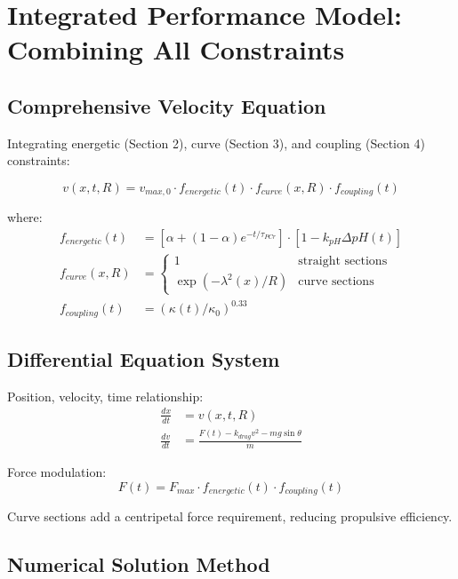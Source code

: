 \section{Integrated Performance Model: Combining All Constraints}

\subsection{Comprehensive Velocity Equation}

Integrating energetic (Section 2), curve (Section 3), and coupling (Section 4) constraints:

\begin{equation}
v(x,t,R) = v_{max,0} \cdot f_{energetic}(t) \cdot f_{curve}(x,R) \cdot f_{coupling}(t)
\end{equation}

where:
\begin{align}
f_{energetic}(t) &= \left[\alpha + (1-\alpha)e^{-t/\tau_{PCr}}\right] \cdot \left[1 - k_{pH}\Delta pH(t)\right] \\
f_{curve}(x,R) &= \begin{cases}
1 & \text{straight sections} \\
\exp(-\lambda^2(x)/R) & \text{curve sections}
\end{cases} \\
f_{coupling}(t) &= (\kappa(t)/\kappa_0)^{0.33}
\end{align}

\subsection{Differential Equation System}

Position, velocity, time relationship:
\begin{align}
\frac{dx}{dt} &= v(x,t,R) \\
\frac{dv}{dt} &= \frac{F(t) - k_{drag}v^2 - mg\sin\theta}{m}
\end{align}

Force modulation:
\begin{equation}
F(t) = F_{max} \cdot f_{energetic}(t) \cdot f_{coupling}(t)
\end{equation}

Curve sections add a centripetal force requirement, reducing propulsive efficiency.

\subsection{Numerical Solution Method}

